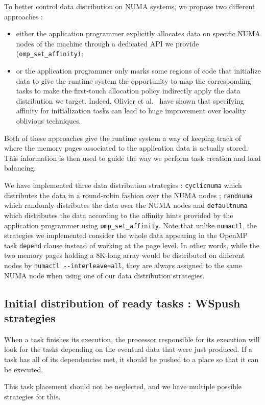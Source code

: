 \documentclass{Styles/llncs}
\begin{document}
To better control data distribution on NUMA systems, we propose two different approaches :
\begin{itemize}
\item either the application programmer explicitly allocates data on specific NUMA nodes of the machine through a dedicated API we provide (\verb!omp_set_affinity)!;
\item or the application programmer only marks some regions of code that initialize data to give the runtime system the opportunity to map the corresponding tasks to make the first-touch allocation policy indirectly apply the data distribution we target. Indeed, Olivier et al.~\cite{Olivier:2012:CMW:2388996.2389085}
have shown that specifying affinity for initialization tasks can lead to huge improvement over locality oblivious techniques.
\end{itemize}
Both of these approaches give the runtime system a way of keeping track of where the memory pages associated to the application data is actually stored.
This information is then used to guide the way we perform task creation and load balancing.

We have implemented three data distribution strategies : \verb!cyclicnuma! which distributes the data in a round-robin fashion over the NUMA nodes ; \verb!randnuma! which randomly distributes the data over the NUMA nodes and \verb!defaultnuma! which distributes the data according to the affinity hints provided by the application programmer using \verb!omp_set_affinity!.
Note that unlike \verb!numactl!, the strategies we implemented consider the whole data appearing in the OpenMP task \verb!depend! clause instead of working at the page level. In other words, while the two memory pages holding a 8K-long array would be distributed on different nodes by \verb!numactl --interleave=all!, they are always assigned to the same NUMA node when using one of our data distribution strategies.

\subsection{Initial distribution of ready tasks : WSpush strategies}

When a task finishes its execution, the processor responsible for its execution
will look for the tasks depending on the eventual data that were just produced.
If a task has all of its dependencies met, it should be pushed to a place
so that it can be executed.

This task placement should not be neglected, and we have multiple possible
strategies for this.
\end{document}
